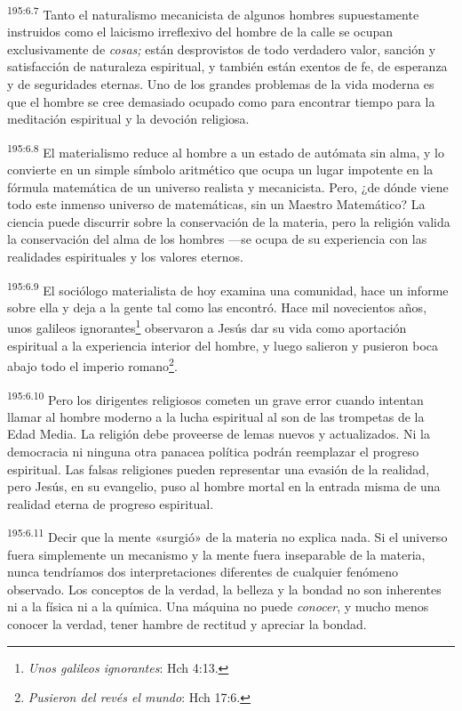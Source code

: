 \par
\textsuperscript{195:6.7} Tanto el naturalismo mecanicista de algunos hombres supuestamente instruidos como el laicismo irreflexivo del hombre de la calle se ocupan exclusivamente de \textit{cosas;} están desprovistos de todo verdadero valor, sanción y satisfacción de naturaleza espiritual, y también están exentos de fe, de esperanza y de seguridades eternas. Uno de los grandes problemas de la vida moderna es que el hombre se cree demasiado ocupado como para encontrar tiempo para la meditación espiritual y la devoción religiosa.

\par
\textsuperscript{195:6.8} El materialismo reduce al hombre a un estado de autómata sin alma, y lo convierte en un simple símbolo aritmético que ocupa un lugar impotente en la fórmula matemática de un universo realista y mecanicista. Pero, ¿de dónde viene todo este inmenso universo de matemáticas, sin un Maestro Matemático? La ciencia puede discurrir sobre la conservación de la materia, pero la religión valida la conservación del alma de los hombres ---se ocupa de su experiencia con las realidades espirituales y los valores eternos.

\par
\textsuperscript{195:6.9} El sociólogo materialista de hoy examina una comunidad, hace un informe sobre ella y deja a la gente tal como las encontró. Hace mil novecientos años, unos galileos ignorantes\footnote{\textit{Unos galileos ignorantes}: Hch 4:13.} observaron a Jesús dar su vida como aportación espiritual a la experiencia interior del hombre, y luego salieron y pusieron boca abajo todo el imperio romano\footnote{\textit{Pusieron del revés el mundo}: Hch 17:6.}.

\par
\textsuperscript{195:6.10} Pero los dirigentes religiosos cometen un grave error cuando intentan llamar al hombre moderno a la lucha espiritual al son de las trompetas de la Edad Media. La religión debe proveerse de lemas nuevos y actualizados. Ni la democracia ni ninguna otra panacea política podrán reemplazar el progreso espiritual. Las falsas religiones pueden representar una evasión de la realidad, pero Jesús, en su evangelio, puso al hombre mortal en la entrada misma de una realidad eterna de progreso espiritual.

\par
\textsuperscript{195:6.11} Decir que la mente «surgió» de la materia no explica nada. Si el universo fuera simplemente un mecanismo y la mente fuera inseparable de la materia, nunca tendríamos dos interpretaciones diferentes de cualquier fenómeno observado. Los conceptos de la verdad, la belleza y la bondad no son inherentes ni a la física ni a la química. Una máquina no puede \textit{conocer}, y mucho menos conocer la verdad, tener hambre de rectitud y apreciar la bondad.


